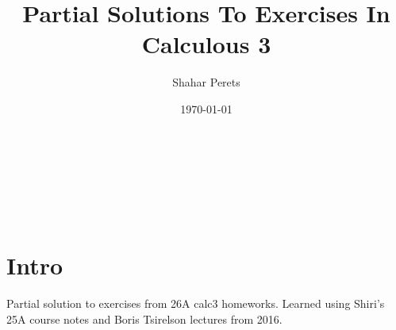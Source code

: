 \documentclass[a4paper]{article}
\author{Shahar Perets}
\title{Partial Solutions To Exercises In Calculous 3}
\date{\today}
\begin{document}
	\huge {\huge\,\\ \vfil {\begin{center}
				\thetitle \\
				\vspace{10pt}
				\large \theauthor \\
				\vspace{3pt}
				\large \thedate
		\end{center}} \vfil	}
	\normalsize
	
	\pagebreak
	
	\section*{Intro}
	Partial solution to exercises from 26A calc3 homeworks. Learned using Shiri's 25A course notes and Boris Tsirelson lectures from 2016.
%
	\tableofcontents
	
	\pagebreak
\end{document}
